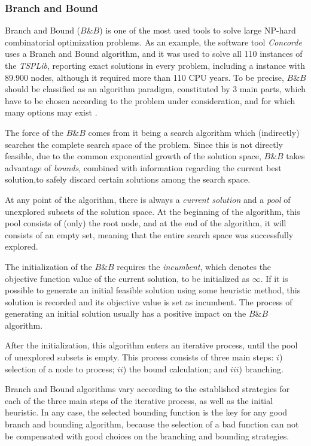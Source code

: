 \subsubsection{Branch and Bound}
\label{sec:bnb}

Branch and Bound ($B\&B$) is one of the most used tools to solve large NP-hard combinatorial optimization problems. As an example, the software tool \textit{Concorde} uses a Branch and Bound algorithm, and it was used to solve all 110 instances of the \textit{TSPLib}, reporting exact solutions in every problem, including a instance with 89.900 nodes, although it required more than 110 CPU years. To be precise, $B\&B$ should be classified as an algorithm paradigm, constituted by 3 main parts, which have to be chosen according to the problem under consideration, and for which many options may exist \cite{bnb}.

The force of the $B\&B$ comes from it being a search algorithm which (indirectly) searches the complete search space of the problem. Since this is not directly feasible, due to the common exponential growth of the solution space, $B\&B$ takes advantage of \textit{bounds}, combined with information regarding the current best solution,to safely discard certain solutions among the search space.

At any point of the algorithm, there is always a \textit{current solution} and a \textit{pool} of unexplored subsets of the solution space. At the beginning of the algorithm, this pool consists of (only) the root node, and at the end of the algorithm, it will consists of an empty set, meaning that the entire search space was successfully explored. 

The initialization of the $B\&B$ requires the \textit{incumbent}, which denotes the objective function value of the current solution, to be initialized as $\infty$. If it is possible to generate an initial feasible solution using some heuristic method, this solution is recorded and its objective value is set as incumbent. The process of generating an initial solution usually has a positive impact on the $B\&B$ algorithm. 

After the initialization, this algorithm enters an iterative process, until the pool of unexplored subsets is empty. This process consists of three main steps: $i$) selection of a node to process; $ii$) the bound calculation; and $iii$) branching.

Branch and Bound algorithms vary according to the established strategies for each of the three main steps of the iterative process, as well as the initial heuristic. In any case, the selected bounding function is the key for any good branch and bounding algorithm, because the selection of a bad function can not be compensated with good choices on the branching and bounding strategies. 


